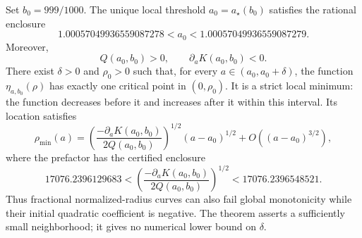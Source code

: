 \begin{theorem}
\label{turn:thm:minimum}
Set $b_0=999/1000$. The unique local threshold $a_0=a_\star(b_0)$
satisfies the rational enclosure
\begin{equation}\label{turn:eq:minbracket}
 1.00057049936559087278<a_0<1.00057049936559087279.
\end{equation}
Moreover,
\[
 Q(a_0,b_0)>0,\qquad \partial_a K(a_0,b_0)<0.
\]
There exist $\delta>0$ and $\rho_0>0$ such that, for every
$a\in(a_0,a_0+\delta)$, the function $\eta_{a,b_0}(\rho)$
has exactly one critical point in $(0,\rho_0)$. It is a strict local
minimum: the function decreases before it and increases after it
within this interval. Its location satisfies
\begin{equation}\label{turn:eq:minimumscale}
 \rho_{\min}(a)
 =\left(\frac{-\partial_a K(a_0,b_0)}{2Q(a_0,b_0)}\right)^{1/2}
       (a-a_0)^{1/2}+O((a-a_0)^{3/2}),
\end{equation}
where the prefactor has the certified enclosure
\[
 17076.2396129683<
 \left(\frac{-\partial_a K(a_0,b_0)}{2Q(a_0,b_0)}\right)^{1/2}
 <17076.2396548521.
\]
Thus fractional normalized-radius curves can also fail global
monotonicity while their initial quadratic coefficient is negative.
The theorem asserts a sufficiently small neighborhood; it gives no
numerical lower bound on $\delta$.
\end{theorem}

